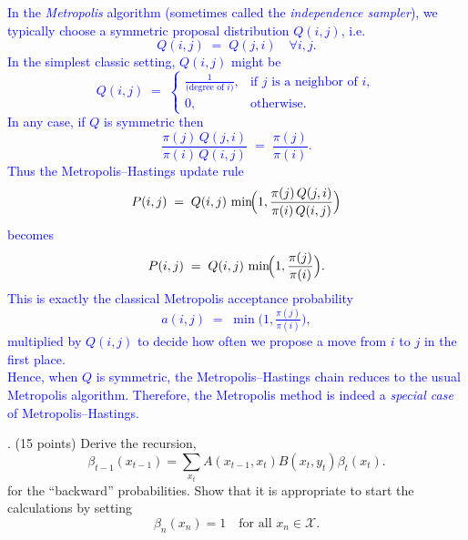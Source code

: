 \documentclass{article}
\begin{document}
\begin{itemize}
    \textcolor{blue}{In the \emph{Metropolis} algorithm (sometimes called the \emph{independence sampler}), we typically choose a symmetric proposal distribution $Q(i,j)$, i.e.\ 
\[
  Q(i,j)\;=\;Q(j,i)\quad \forall i,j.
\]
In the simplest classic setting, $Q(i,j)$ might be 
\[
  Q(i,j) 
  \;=\;
  \begin{cases}
    \frac{1}{\text{(degree of $i$)}}, & \text{if $j$ is a neighbor of $i$},\\[3pt]
    0, & \text{otherwise}.
  \end{cases}
\]
In any case, if $Q$ is symmetric then
\[
  \frac{\pi(j)\,Q(j,i)}{\pi(i)\,Q(i,j)}
  \;=\;
  \frac{\pi(j)}{\pi(i)}.
\]
Thus the Metropolis--Hastings update rule
\[
  P(i,j) \;=\; Q(i,j)\,\min\!\Bigl(1,\frac{\pi(j)\,Q(j,i)}{\pi(i)\,Q(i,j)}\Bigr)
\]
becomes
\[
  P(i,j) \;=\; Q(i,j)\,\min\!\Bigl(1,\frac{\pi(j)}{\pi(i)}\Bigr).
\]
This is exactly the classical Metropolis acceptance probability
\[
  a(i,j) 
  \;=\; 
  \min\bigl(1,\tfrac{\pi(j)}{\pi(i)}\bigr),
\]
multiplied by $Q(i,j)$ to decide how often we propose a move from $i$ to $j$ in the first place. \\ 
Hence, when $Q$ is symmetric, the Metropolis--Hastings chain reduces to the usual Metropolis algorithm. 
Therefore, the Metropolis method is indeed a \emph{special case} of Metropolis--Hastings.
}

\end{itemize}


\bigskip

. (15 points) Derive the recursion, 
\[
\beta_{t-1}(x_{t-1}) = \sum_{x_t} A(x_{t-1}, x_t) B(x_t, y_t) \beta_t(x_t).
\]
for the “backward” probabilities. Show that it is appropriate to start the calculations by setting
\[
\beta_n(x_n) = 1 \quad \text{for all } x_n \in \mathcal{X}.
\]

\end{document}
